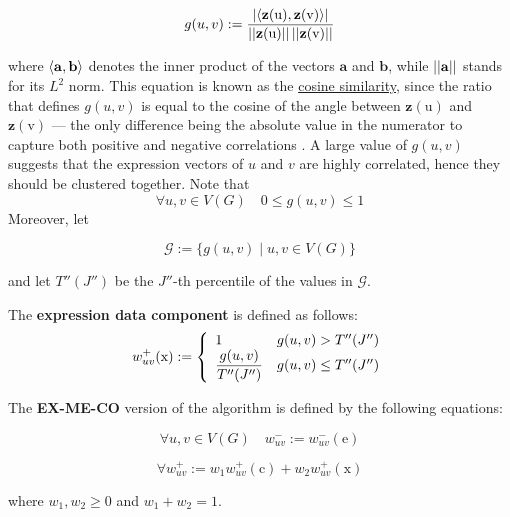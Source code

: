 \begin{equation}
    g(u, v) := \dfrac{\abs{\abk{\mathrm{\mathbf z(u)}, \mathrm{\mathbf z(v)}}}}{\abs{\abs{\mathrm{\mathbf z(u)}}} \abs{\abs{\mathrm{\mathbf z(v)}}}}
\end{equation}

where $\abk{\mathrm{\mathbf a}, \mathrm{\mathbf b}}$ denotes the inner product of the vectors $\mathrm{\mathbf a}$ and $\mathrm{\mathbf b}$, while $\abs{\abs{\mathrm{\mathbf a}}}$ stands for its $L^2$ norm. This equation is known as the \href{https://en.wikipedia.org/wiki/Cosine_similarity}{cosine similarity}, since the ratio that defines $g(u, v)$ is equal to the cosine of the angle between $\mathrm {\mathbf z(u)}$ and $\mathrm {\mathbf z(v)}$ --- the only difference being the absolute value in the numerator to capture both positive and negative correlations . A large value of $g(u, v)$ suggests that the expression vectors of $u$ and $v$ are highly correlated, hence they should be clustered together. Note that $$\forall u, v \in V(G) \quad 0 \le g(u, v) \le 1$$ Moreover, let

\begin{equation}
    \mathscr G := \{g(u, v) \mid u, v \in V(G)\}
\end{equation}

and let $T''(J'')$ be the $J''$-th percentile of the values in $\mathscr G$.

\begin{definition}
    The \textbf{expression data component} is defined as follows: $$w_{uv}^+(\mathrm x) := \soe{ll}{1 & g(u, v) > T''(J'') \\ \dfrac{g(u, v)}{T''(J'')} & g(u, v) \le T''(J'')}$$
\end{definition}

\begin{definition}[EX-ME-CO]
    The \textbf{EX-ME-CO} version of the algorithm is defined by the following equations:

    \begin{equation}
        \forall u, v \in V(G) \quad w_{uv}^- := w_{uv}^-(\mathrm e)
    \end{equation}

    \begin{equation}
        \forall w_{uv}^+ := w_1 w_{uv}^+(\mathrm c) + w_2 w_{uv}^+(\mathrm x)
    \end{equation}

    where $w_1, w_2 \ge 0$ and $w_1 + w_2 = 1$.
\end{definition}

